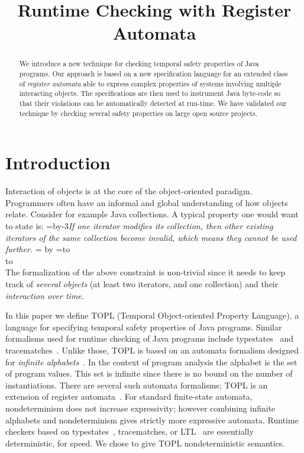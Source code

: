 \documentclass[10pt, preprint]{sigplanconf} %
\title{Runtime Checking with Register Automata}
\newcommand{\eqquote}[2]{{%
  \refstepcounter{equation}\label{#2}%
  \setbox0=\vbox{\advance\hsize by-3\parindent\noindent\em#1}%
  \newdimen\x\x=\ht0 \advance\x by\dp0%
  \setbox1=\vbox to\x{\vss\hbox{(\arabic{equation})}\vss}%
  \leavevmode\\[1ex]%
  \hbox to\hsize{\hskip 1.5\parindent\box0\hfil\box1}%
  \\[1ex]}}
\begin{document}
\maketitle
\begin{abstract} %
We introduce a new technique for checking temporal safety properties of Java programs.
Our approach is based on a new specification language for an extended class of {\em register automata} able to express complex properties of systems involving multiple interacting objects.
The specifications are then used to instrument Java byte-code so that their violations can be automatically detected at run-time.
We have validated our technique by checking several safety properties on large open source projects.
\end{abstract}

\section{Introduction} %
Interaction of objects is at the core of the object-oriented paradigm.
Programmers often have an informal and global understanding of how objects relate.
Consider for example Java collections.
A typical property one would want to state is:
\eqquote{If one iterator modifies its collection, then other existing iterators of the same collection become invalid, which means they cannot be used further.}{q:concur-it}
The formalization of the above constraint is non-trivial since it needs to keep track of {\em several objects} (at least two iterators, and one collection) and their {\em interaction over time}.

In this paper we define TOPL (Temporal Object-oriented Property Language), a language for specifying temporal safety properties of Java programs.
Similar formalisms used for runtime checking of Java programs include typestates~\cite{dblp:journals/scp/harel87} and tracematches~\cite{dblp:conf/oopsla/allanachklmsst05}.
Unlike those, TOPL is based on an automata formalism designed for {\em infinite alphabets}~\cite{dblp:conf/csl/segoufin06}.
In the context of program analysis the alphabet is the set of program values.
This set is infinite since there is no bound on the number of instantiations.
There are several such automata formalisms;
TOPL is an extension of register automata~\cite{dblp:journals/tcs/kaminskif94}.
For standard finite-state automata, nondeterminism does not increase expressivity;
however combining  infinite alphabets and nondeterminism gives strictly more expressive automata. 
Runtime checkers based on typestates~\cite{arnold:2008}, tracematches, or LTL~\cite{dblp:conf/oopsla/chenr07} are essentially deterministic, for speed.
We chose to give TOPL nondeterministic semantics.
\end{document}
